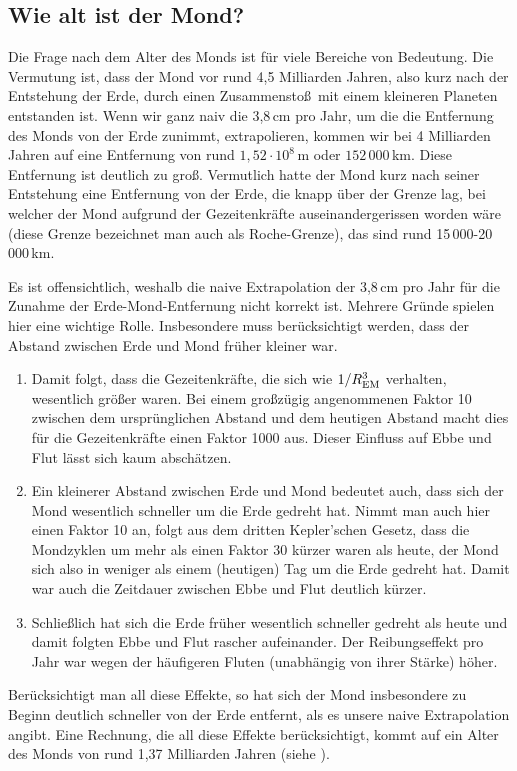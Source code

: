 \subsection{Wie alt ist der Mond?}

Die Frage nach dem Alter des Monds ist f\"ur viele Bereiche von Bedeutung. 
Die Vermutung
ist, dass der Mond vor rund 4,5 Milliarden Jahren, also kurz nach der Entstehung der Erde, durch
einen Zusammensto\ss\ mit einem kleineren Planeten entstanden ist. 
Wenn wir ganz naiv die 3,8\,cm 
pro Jahr, um die die Entfernung des Monds von der Erde zunimmt, extrapolieren, kommen wir
bei 4 Milliarden Jahren auf eine Entfernung von rund $1,52 \cdot 10^8$\,m oder $152\,000$\,km. 
Diese Entfernung ist deutlich zu gro\ss. Vermutlich hatte der Mond kurz nach seiner Entstehung
eine Entfernung von der Erde, die knapp \"uber der Grenze lag, bei welcher der Mond aufgrund
der Gezeitenkr\"afte auseinandergerissen worden w\"are (diese Grenze bezeichnet man auch als
Roche-Grenze), das sind rund 15\,000-20\,000\,km. 

Es ist offensichtlich, weshalb die naive Extrapolation der 3,8\,cm pro Jahr f\"ur die Zunahme
der Erde-Mond-Entfernung nicht korrekt ist. Mehrere Gr\"unde spielen hier eine wichtige Rolle.
Insbesondere muss ber\"ucksichtigt werden, dass der Abstand zwischen Erde und Mond
fr\"uher kleiner war. 
\begin{enumerate}
\item
Damit folgt, dass die Gezeitenkr\"afte, die sich wie $1/R_{\rm EM}^3$ verhalten, wesentlich
gr\"o\ss er waren. Bei einem gro\ss z\"ugig angenommenen Faktor 10 zwischen dem urspr\"unglichen
Abstand und dem heutigen Abstand macht dies f\"ur die Gezeitenkr\"afte einen Faktor 1000 aus. 
Dieser Einfluss auf Ebbe und Flut l\"asst sich kaum absch\"atzen.
\item
Ein kleinerer Abstand zwischen Erde und Mond bedeutet auch, dass sich der Mond wesentlich
schneller um die Erde gedreht hat. Nimmt man auch hier einen Faktor 10 an, folgt aus dem dritten
Kepler'schen Gesetz, dass die Mondzyklen um mehr als einen Faktor 30 k\"urzer waren als heute,
der Mond sich also in weniger als einem (heutigen) Tag um die Erde gedreht hat. Damit war
auch die Zeitdauer zwischen Ebbe und Flut deutlich k\"urzer.
\item
Schlie\ss lich hat sich die Erde fr\"uher wesentlich schneller gedreht als heute und damit
folgten Ebbe und Flut rascher aufeinander. Der Reibungseffekt pro Jahr war wegen der
h\"aufigeren Fluten (unabh\"angig von ihrer St\"arke) h\"oher.
\end{enumerate} 
Ber\"ucksichtigt man all diese Effekte, so hat sich der Mond insbesondere zu Beginn deutlich
schneller von der Erde entfernt, als es unsere naive Extrapolation angibt. Eine Rechnung, die
all diese Effekte ber\"ucksichtigt, kommt auf ein Alter des Monds von rund 1,37 Milliarden 
Jahren (siehe \cite{DeYoung}).

